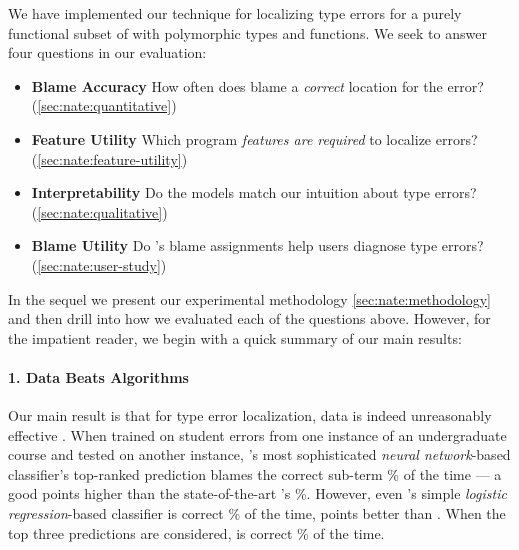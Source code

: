 \label{sec:nate:evaluation}


We have implemented our technique for localizing type errors for a
purely functional subset of \ocaml with polymorphic types and functions.
%
We seek to answer four questions in our evaluation:
%
\begin{itemize}
\item \textbf{Blame Accuracy}
  How often does \toolname
  blame a \emph{correct}
  location for the error?
  (\autoref{sec:nate:quantitative})
\item \textbf{Feature Utility}
  Which program \emph{features are required}
  to localize errors?
   (\autoref{sec:nate:feature-utility})
\item \textbf{Interpretability}
  Do the models match our intuition about type errors?
  (\autoref{sec:nate:qualitative})
\item \textbf{Blame Utility}
  Do \toolname's blame assignments help
  users diagnose type errors?
  (\autoref{sec:nate:user-study})
\end{itemize}
%
%
In the sequel we present our experimental
methodology \autoref{sec:nate:methodology} and
then drill into how we evaluated each of
the questions above.
%
However, for the impatient reader, we begin
with a quick summary of our main results:
%
%
%

\paragraph{1. Data Beats Algorithms}
Our main result is that for type error
localization, data is indeed unreasonably
effective \citep{Halevy2009-so}.
%
When trained on student errors from one
instance of an undergraduate course and
tested on another instance,
\toolname's most sophisticated
\emph{neural network}-based
classifier's top-ranked
prediction blames the correct
sub-term \HiddenFhTopOne\% of the time
--- a good \ToolnameWinSherrloc points
higher than the state-of-the-art
\sherrloc's \SherrlocTopOne\%.
%
However, even \toolname's simple
\emph{logistic regression}-based
classifier is correct \LinearTopOne\% of the time,
\ie \LinearWinSherrloc points better than \sherrloc.
%
When the top three predictions are considered,
\toolname is correct \HiddenFhTopThree\% of the time.

